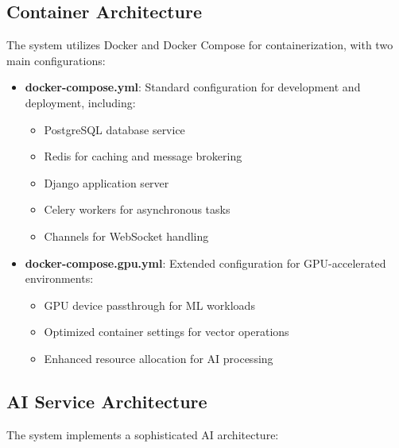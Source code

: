 \subsection{Container Architecture}
The system utilizes Docker and Docker Compose for containerization, with two main configurations:

\begin{itemize}
  \item \textbf{docker-compose.yml}: Standard configuration for development and deployment, including:
    \begin{itemize}
      \item PostgreSQL database service
      \item Redis for caching and message brokering
      \item Django application server
      \item Celery workers for asynchronous tasks
      \item Channels for WebSocket handling
    \end{itemize}
    
  \item \textbf{docker-compose.gpu.yml}: Extended configuration for GPU-accelerated environments:
    \begin{itemize}
      \item GPU device passthrough for ML workloads
      \item Optimized container settings for vector operations
      \item Enhanced resource allocation for AI processing
    \end{itemize}
\end{itemize}

\subsection{AI Service Architecture}
The system implements a sophisticated AI architecture:

